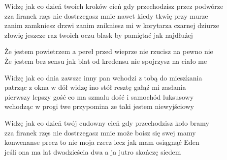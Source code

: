 \begin{text}
    \small{
    Widzę jak co dzień twoich kroków cień gdy przechodzisz przez podwórze\\
    zza firanek rzęs nie dostrzegasz mnie nawet kiedy tkwię przy murze\\
    zanim zamkniesz drzwi zanim znikniesz mi w korytarza czarnej dziurze\\
    złowię jeszcze raz twoich oczu blask by pamiętać jak najdłużej

    Że jestem powietrzem a pereł przed wieprze nie rzucisz na pewno nie\\
    Że jestem bez sensu jak blat od kredensu nie spojrzysz na ciało me

    Widzę jak co dnia zawsze inny pan wchodzi z tobą do mieszkania\\
    patrząc z okna w dół widzę ino stół resztę gałąź mi zasłania\\
    pierwszy lepszy gość co ma szmalu dość i samochód luksusowy\\
    wchodząc w progi twe przypomina ze taki jestem niewyjściowy

    Widzę jak co dzień twój cudowny cień gdy przechodzisz koło bramy\\
    zza firanek rzęs nie dostrzegasz mnie może boisz się swej mamy\\
    konwenanse precz to nie moja rzecz lecz jak mam osiągnąć Eden\\
    jeśli ona ma lat dwadzieścia dwa a ja jutro skończę siedem
    }
\end{text}
\begin{chord}
    \small{

    }
\end{chord}